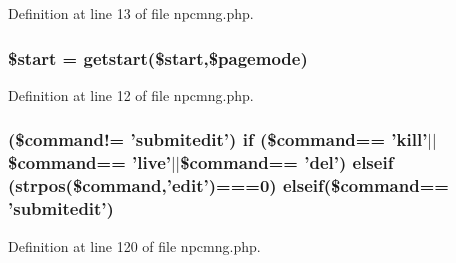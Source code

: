 Definition at line 13 of file npcmng.\+php.

\hypertarget{npcmng_8php_a50a00e7de77365e00b117e73aa82fb9b}{
\subsubsection[{\$start}]{\setlength{\rightskip}{0pt plus 5cm}\$start = {\bf getstart}(\$start,\$pagemode)}}\label{npcmng_8php_a50a00e7de77365e00b117e73aa82fb9b}


Definition at line 12 of file npcmng.\+php.

\hypertarget{npcmng_8php_aebac72f4767ff39b22abc0d8f2793660}{
\subsubsection[{elseif}]{ (\$command!= 'submitedit') {\bf if} (\$command== '{\bf kill}'$\vert$$\vert$\$command== 'live'$\vert$$\vert$\$command== 'del') elseif (strpos(\$command,'edit')===0) elseif(\$command== 'submitedit')}}\label{npcmng_8php_aebac72f4767ff39b22abc0d8f2793660}


Definition at line 120 of file npcmng.\+php.

